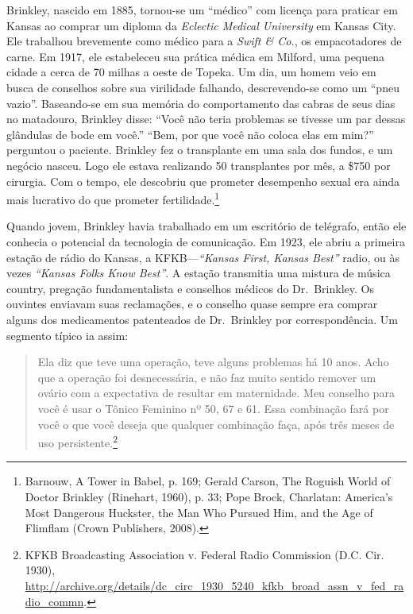 \documentclass{book}
\newcommand{\ingles}[1]{\textit{#1}}
\begin{document}
Brinkley, nascido em 1885, tornou-se um ``médico'' com licença para praticar em
Kansas ao comprar um diploma da \ingles{Eclectic Medical University} em Kansas
City. Ele trabalhou brevemente como médico para a \ingles{Swift \& Co.}, os
empacotadores de carne. Em 1917, ele estabeleceu sua prática médica em Milford,
uma pequena cidade a cerca de 70 milhas a oeste de Topeka. Um dia, um homem veio
em busca de conselhos sobre sua virilidade falhando, descrevendo-se como um ``pneu
vazio''. Baseando-se em sua memória do comportamento das cabras de seus dias no
matadouro, Brinkley disse: ``Você não teria problemas se tivesse um par dessas
glândulas de bode em você.'' ``Bem, por que você não coloca elas em mim?'' perguntou
o paciente. Brinkley fez o transplante em uma sala dos fundos, e um negócio nasceu.
Logo ele estava realizando 50 transplantes por mês, a \$750 por cirurgia. Com o
tempo, ele descobriu que prometer desempenho sexual era ainda mais lucrativo do
que prometer fertilidade.\footnote{Barnouw, A Tower in Babel, p. 169; Gerald Carson,
The Roguish World of Doctor Brinkley (Rinehart, 1960), p. 33; Pope Brock, Charlatan:
America's Most Dangerous Huckster, the Man Who Pursued Him, and the Age of Flimflam
(Crown Publishers, 2008).}

Quando jovem, Brinkley havia trabalhado em um escritório de telégrafo, então ele
conhecia o potencial da tecnologia de comunicação. Em 1923, ele abriu a primeira
estação de rádio do Kansas, a KFKB---\ingles{``Kansas First, Kansas Best''} radio,
ou às vezes \ingles{``Kansas Folks Know Best''}. A estação transmitia uma mistura
de música country, pregação fundamentalista e conselhos médicos do Dr.~Brinkley.
Os ouvintes enviavam suas reclamações, e o conselho quase sempre era comprar alguns
dos medicamentos patenteados de Dr.~Brinkley por correspondência. Um segmento típico
ia assim:

\begin{quote}
    Ela diz que teve uma operação, teve alguns problemas há 10 anos. Acho que
    a operação foi desnecessária, e não faz muito sentido remover um ovário com
    a expectativa de resultar em maternidade. Meu conselho para você é usar o
    Tônico Feminino nº 50, 67 e 61. Essa combinação fará por você o que você
    deseja que qualquer combinação faça, após três meses de uso persistente.\footnote{KFKB
    Broadcasting Association v. Federal Radio Commission (D.C. Cir. 1930),
    \url{http://archive.org/details/dc_circ_1930_5240_kfkb_broad_assn_v_fed_radio_commn}.}
\end{quote}
\end{document}
